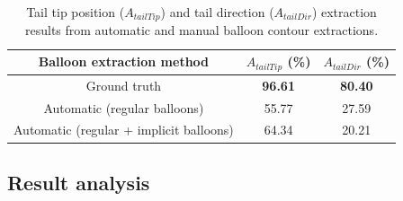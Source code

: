   \begin{table}[h]

    \centering
    \caption[Tail tip position and tail direction extraction results from automatic and manual balloon contour extractions]{Tail tip position ($A_{tailTip}$) and tail direction ($A_{tailDir}$) extraction results from automatic and manual balloon contour extractions.}
    \begin{tabular}{|c|c|c|}
          \hline
          Balloon extraction method&  $A_{tailTip}$ (\%)  & $A_{tailDir}$ (\%)    \\
          \hline
          Ground truth        & \textbf{96.61}    & \textbf{80.40}     \\
          \hline
          Automatic (regular balloons)    & 55.77    & 27.59     \\
          \hline
          Automatic (regular + implicit balloons)    & 64.34    & 20.21     \\
          \hline
        \end{tabular}
    \label{tab:ex:tail_evaluation}
  \end{table}%



\subsection{Result analysis} %
\label{sub:ex:result_analysis_tail_evaluation}

